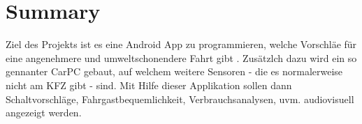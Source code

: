 \chapter{Summary}

Ziel des Projekts ist es eine Android App zu programmieren, welche Vorschläe für eine angenehmere und umweltschonendere Fahrt gibt . Zusätzlch dazu wird ein so gennanter CarPC gebaut, auf welchem weitere Sensoren - die es normalerweise nicht am KFZ gibt - sind. Mit Hilfe dieser Applikation sollen dann Schaltvorschläge, Fahrgastbequemlichkeit, Verbrauchsanalysen, uvm. audiovisuell angezeigt werden. 

